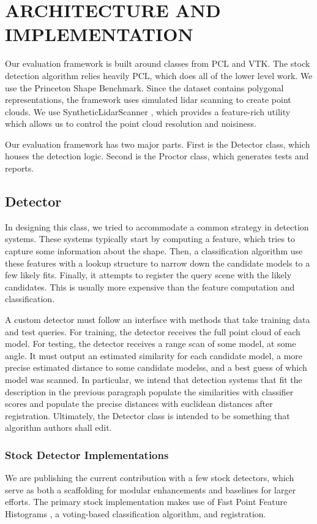 \section{ARCHITECTURE AND IMPLEMENTATION}
Our evaluation framework is built around classes from PCL and VTK.
The stock detection algorithm relies heavily PCL, which does all of the lower level work.
We use the Princeton Shape Benchmark.
Since the dataset contains polygonal representations, the framework uses simulated lidar scanning to create point clouds. We use SyntheticLidarScanner \cite{Doria2009}, which provides a feature-rich utility which allows us to control the point cloud resolution and noisiness.

Our evaluation framework has two major parts. First is the Detector class, which houses the detection logic. Second is the Proctor class, which generates tests and reports.

\subsection{Detector}
In designing this class, we tried to accommodate a common strategy in detection systems.
These systems typically start by computing a feature, which tries to capture some information about the shape.
Then, a classification algorithm use these features with a lookup structure to narrow down the candidate models to a few likely fits.
Finally, it attempts to register the query scene with the likely candidates. This is usually more expensive than the feature computation and classification.

A custom detector must follow an interface with methods that take training data and test queries.
For training, the detector receives the full point cloud of each model.
For testing, the detector receives a range scan of some model, at some angle. It must output an estimated similarity for each candidate model, a more precise estimated distance to some candidate modelss, and a best guess of which model was scanned.
In particular, we intend that detection systems that fit the description in the previous paragraph populate the similarities with classifier scores and populate the precise distances with euclidean distances after registration.
Ultimately, the Detector class is intended to be something that algorithm authors shall edit.

\subsubsection{Stock Detector Implementations}
We are publishing the current contribution with a few stock detectors, which serve as both a scaffolding for modular enhancements and baselines for larger efforts.
The primary stock implementation makes use of Fast Point Feature Histograms \cite{fpfh1, fpfh2}, a voting-based classification algorithm, and registration.

